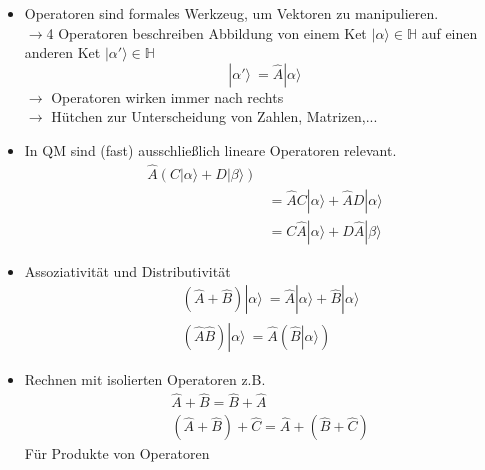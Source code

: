 \documentclass[10pt,article,colorback,accentcolor=tud9d]{scrartcl}
\begin{document}
\begin{itemize}
\item Operatoren sind formales Werkzeug, um Vektoren zu manipulieren. \\
 
$\rightarrow$4 Operatoren beschreiben Abbildung von einem Ket $\left|\right. 
\alpha \rangle  \in \mathbb{H}$ auf einen anderen Ket  $\left|\right. \alpha' \rangle  \in 
\mathbb{H}$
\begin{equation}
  \left|\right. \alpha' \rangle  \ = \hat{A} \left|\right. \alpha \rangle 
\end{equation}
$\rightarrow$ Operatoren wirken immer nach rechts\\
$\rightarrow$ Hütchen zur Unterscheidung von Zahlen, Matrizen,...
\item In QM sind (fast) ausschließlich lineare Operatoren relevant.
\begin{equation}
\begin{aligned}
  \hat{A} (C\left|\right. \alpha \rangle  + D\left|\right. \beta \rangle )&\\
  &= \hat{A} C\left|\right. \alpha \rangle  + \hat{A} D \left|\right. \alpha \rangle \\
  &= C \hat{A} \left|\right. \alpha \rangle  + D \hat{A} \left|\right. \beta \rangle 
\end{aligned}
\end{equation}
\item Assoziativität und Distributivität 
\begin{equation}
\begin{aligned}
&(\hat{A} + \hat{B}) \left|\right. \alpha \rangle  \ = \hat{A} \left|\right. \alpha \rangle 
 + \hat{B} \left|\right. \alpha \rangle \\
&(\hat{A} \hat{B})\left|\right. \alpha \rangle  \ = \hat{A} (\hat{B} \left|\right. 
\alpha \rangle )
\end{aligned}
\end{equation}
\item Rechnen mit isolierten Operatoren z.B.
\begin{equation}
\begin{aligned}
  &\hat{A} + \hat{B} = \hat{B} + \hat{A} \\
  &(\hat{A} + \hat{B}) + \hat{C}= \hat{A} +(\hat{B}+ \hat{C})
\end{aligned}
\end{equation}
Für Produkte von Operatoren
\begin{equation}
\begin{aligned}

\end{aligned}
\end{equation}
\end{itemize}
\end{document}

